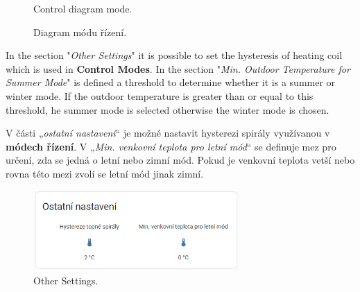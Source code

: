 \begin{English}
\begin{figure}[H]
    \centering
    \def\svgwidth{1\columnwidth}
    \graphicspath{{pictures/czech/software/svg/}}
    
    \caption{Control diagram mode.}
    \label{fig:diagram-control-modes}
\end{figure}
\end{English}

\begin{Czech}
\begin{figure}[H]
    \centering
    \def\svgwidth{1\columnwidth}
    \graphicspath{{pictures/czech/software/svg/}}
    
    \caption{Diagram módu řízení.}
    \label{fig:diagram-control-modes}
\end{figure}
\end{Czech}


\begin{English}
\end{English}

\begin{Czech}
\end{Czech}


\begin{English}
In the section "\textit{Other Settings}" it is possible to set the hysteresis of heating coil which is used in \textbf{Control Modes}. In the section "\textit{Min. Outdoor Temperature for Summer Mode}" is defined a threshold to determine whether it is a summer or winter mode. If the outdoor temperature is greater than or equal to this threshold,  he summer mode is selected otherwise the winter mode is chosen.
\end{English}

\begin{Czech}
V části „\textit{ostatní nastavení}“ je možné nastavit hysterezi spirály využívanou v \textbf{módech řízení}. V „\textit{Min. venkovní teplota pro letní mód}“ se definuje mez pro určení, zda se jedná o letní nebo zimní mód. Pokud je venkovní teplota vetší nebo rovna této mezi zvolí se letní mód jinak zimní.
\end{Czech}


\begin{English}
\begin{figure}[H]
    \centering
    \includegraphics[width=0.7\textwidth]{pictures/czech/software/other-settings.png}
    \caption{Other Settings.}
    \label{fig:other-settings}
\end{figure}
\end{English}

